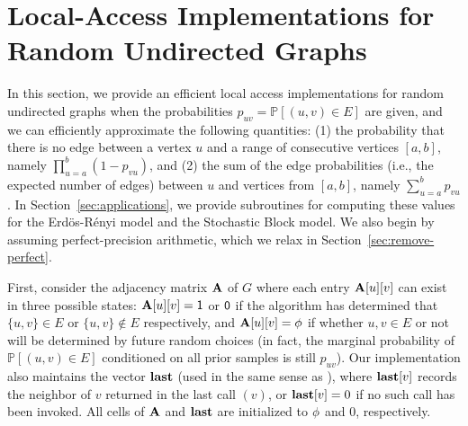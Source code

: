 \section{Local-Access Implementations for Random Undirected Graphs}
\label{sec:undirected}

In this section, we provide an efficient local access implementations for random undirected graphs
when the probabilities $p_{uv}=\mathbb P[(u,v)\in E]$ are given, and we can efficiently approximate the following quantities:
(1) the probability that there is no edge between a vertex $u$ and a range of consecutive vertices $[a,b]$, namely $\prod_{u=a}^b (1-p_{vu})$, and
(2) the sum of the edge probabilities (i.e., the expected number of edges) between $u$ and vertices from $[a,b]$, namely $\sum_{u=a}^b p_{vu}$.
In Section~\ref{sec:applications}, we provide subroutines for computing these values for the Erd\"{o}s-R\'{e}nyi model and the Stochastic Block model.
We also begin by assuming perfect-precision arithmetic, which we relax in Section~\ref{sec:remove-perfect}.

\iffalse
{\color{blue}
Alternatively, we provide an implementation for these two models with a deterministic performance guarantee in Section~\ref{sec:ER-det}.
In this setting, introducing the \func{Vertex-Pair} queries results in an amortized guarantee on the run-time.
The deterministic guarantee comes at the cost of more complicated data-structures
(we use a two-level nested interval tree and binary search tree).
}
\fi

First, consider the adjacency matrix $\mathbf{A}$ of $G$ where each entry $\mathbf{A}[u][v]$ can exist in three possible states:
$\mathbf{A}[u][v] = \mathsf{1}$ or $\mathsf{0}$ if the algorithm has determined that $\{u,v\}\in E$ or $\{u,v\} \notin E$ respectively,
and $\mathbf{A}[u][v] = \phi$ if whether ${u,v}\in E$ or not will be determined by future random choices
(in fact, the marginal probability of $\mathbb P[(u,v)\in E]$ conditioned on all prior samples is still $p_{uv}$).
Our implementation also maintains the vector $\mathbf{last}$ (used in the same sense as \cite{reut}),
where $\mathbf{last}[v]$ records the neighbor of $v$ returned in the last call $(v)$, or $\mathbf{last}[v]=0$ if no such call has been invoked.
All cells of $\mathbf{A}$ and $\mathbf{last}$ are initialized to $\phi$ and $0$, respectively.

